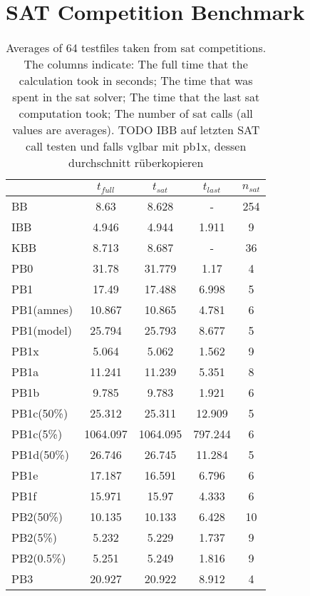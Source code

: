 \section{SAT Competition Benchmark}
\begin{wraptable}{r}{8.5cm} %
\begin{tabular}{l| c c c c}
 & $t_{full}$ & $t_{sat}$ & $t_{last}$& $n_{sat}$ \\
 \hline
BB & 8.63 & 8.628 & - & 254\\
IBB & 4.946 & 4.944 & 1.911 & 9\\
KBB & 8.713 & 8.687 & - & 36\\
PB0 & 31.78 & 31.779 & 1.17 & 4\\
PB1 & 17.49 & 17.488 & 6.998 & 5\\
PB1(amnes) & 10.867 & 10.865 & 4.781 & 6\\
PB1(model) & 25.794 & 25.793 & 8.677 & 5\\
PB1x & 5.064 & 5.062 & 1.562 & 9\\
PB1a & 11.241 & 11.239 & 5.351 & 8\\
PB1b & 9.785 & 9.783 & 1.921 & 6\\
PB1c(50\%) & 25.312 & 25.311 & 12.909 & 5\\
PB1c(5\%) & 1064.097 & 1064.095 & 797.244 & 6\\
PB1d(50\%) & 26.746 & 26.745 & 11.284 & 5\\
PB1e & 17.187 & 16.591 & 6.796 & 6\\
PB1f & 15.971 & 15.97 & 4.333 & 6\\
PB2(50\%) & 10.135 & 10.133 & 6.428 & 10\\
PB2(5\%) & 5.232 & 5.229 & 1.737 & 9\\
PB2(0.5\%) & 5.251 & 5.249 & 1.816 & 9\\
PB3 & 20.927 & 20.922 & 8.912 & 4\\
\end{tabular}
\caption{Averages of 64 testfiles taken from sat competitions. The columns indicate: The full time that the calculation took in seconds; The time that was spent in the sat solver; The time that the last sat computation took; The number of sat calls (all values are averages). TODO IBB auf letzten SAT call testen und falls vglbar mit pb1x, dessen durchschnitt rüberkopieren}
\label{tab:satCompAvg} %
\end{wraptable}

